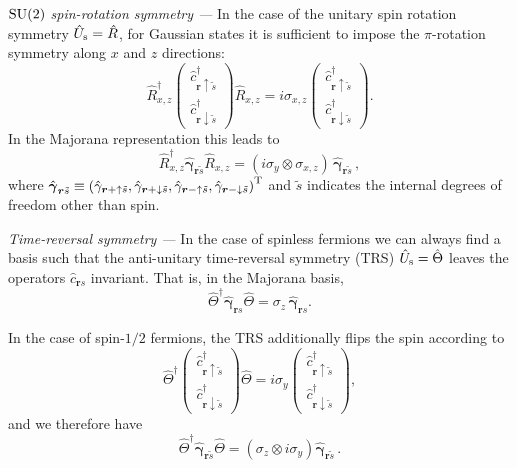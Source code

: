 \documentclass[prl,twocolumn,preprintnumbers,superscriptaddress,amsmath,amssymb]{revtex4-1}
\begin{document}
\emph{${\rm SU}(2)$ spin-rotation symmetry ---} In the case of the unitary spin rotation symmetry $\hat U_{\rm s}=\hat R$, for Gaussian states it is sufficient to impose the $\pi$-rotation symmetry along $x$ and $z$ directions:
\begin{equation}
\hat R_{x,z}^\dag \begin{pmatrix} \hat c^\dag_{\boldsymbol{r}\uparrow\tilde s} \\ \hat c^\dag_{\boldsymbol{r}\downarrow\tilde s} \end{pmatrix} \hat R_{x,z} = i\sigma_{x,z} \begin{pmatrix} \hat c^\dag_{\boldsymbol{r}\uparrow\tilde s} \\ \hat c^\dag_{\boldsymbol{r}\downarrow\tilde s} \end{pmatrix}.
\end{equation}
In the Majorana representation this leads to
\begin{equation}
\hat R_{x,z}^\dag\hat{\boldsymbol{\gamma}}_{\boldsymbol{r}\tilde s} \hat R_{x,z} = (i\sigma_y\otimes \sigma_{x,z})\,\hat{\boldsymbol{\gamma}}_{\boldsymbol{r}\tilde s}\,,
\end{equation}
where $\hat{\boldsymbol{\gamma}}_{\boldsymbol{r}\tilde s}\equiv \left(\hat\gamma_{\boldsymbol{r}+\uparrow\tilde s},\hat\gamma_{\boldsymbol{r}+\downarrow\tilde s},\hat\gamma_{\boldsymbol{r}-\uparrow\tilde s},\hat\gamma_{\boldsymbol{r}-\downarrow\tilde s}\right)^{\rm T}$ and $\tilde s$ indicates the internal degrees of freedom other than spin.

\emph{Time-reversal symmetry ---} In the case of spinless fermions we can always find a basis such that the anti-unitary time-reversal symmetry (TRS) $\hat U_{\rm s}=\hat \Theta$ leaves the operators $\hat c_{\boldsymbol{r}s}$ invariant. That is, in the Majorana basis,
\begin{equation}
\hat\Theta^\dag \hat{\boldsymbol{\gamma}}_{\boldsymbol{r}s} \hat\Theta = \sigma_z\, \hat{\boldsymbol{\gamma}}_{\boldsymbol{r}s}.
\end{equation}

In the case of spin-$1/2$ fermions, the TRS additionally flips the spin according to
\begin{equation}
\hat \Theta^\dag \begin{pmatrix} \hat c^\dag_{\boldsymbol{r}\uparrow\tilde s} \\ \hat c^\dag_{\boldsymbol{r}\downarrow\tilde s} \end{pmatrix}  \hat \Theta = i\sigma_{y} \begin{pmatrix} \hat c^\dag_{\boldsymbol{r}\uparrow\tilde s} \\ \hat c^\dag_{\boldsymbol{r}\downarrow\tilde s} \end{pmatrix},
\end{equation}
and we therefore have
\begin{equation}
\hat\Theta^\dag\hat{\boldsymbol{\gamma}}_{\boldsymbol{r}\tilde s} \hat \Theta = (\sigma_z\otimes i\sigma_y)\hat{\boldsymbol{\gamma}}_{\boldsymbol{r}\tilde s}\,.
\end{equation}
\end{document}
